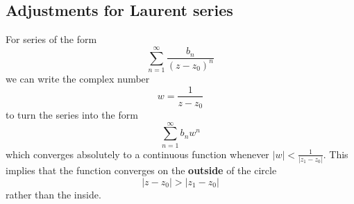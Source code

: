 \documentclass{article}
\renewcommand{\emph}{\textbf}
\begin{document}
\subsection{Adjustments for Laurent series}
For series of the form
\[
	\sum_{n=1}^\infty \frac{b_n}{(z - z_0)^n}
\]
we can write the complex number
\[
	w = \frac{1}{z - z_0}
\]
to turn the series into the form
\[
	\sum_{n=1}^\infty b_n w^n
\]
which converges absolutely to a continuous function whenever $|w| < \frac{1}{|z_1 - z_0|}$. This implies that the function converges on the \emph{outside} of the circle
\[
	|z - z_0| > |z_1 - z_0|
\]
rather than the inside.
\end{document}
